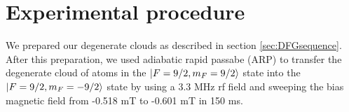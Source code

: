 \section{Experimental procedure}
We prepared our degenerate \K{} clouds as described in section \ref{sec:DFGsequence}. After this preparation, we used adiabatic rapid passabe (ARP) to transfer the degenerate cloud of \K{} atoms in the $\mathinner{|{F=9/2,m_F=9/2}\rangle}$ state into the $\mathinner{|{F=9/2,m_F=-9/2}\rangle}$ state by using a 3.3 MHz rf field and sweeping the bias magnetic field from -0.518 mT to -0.601 mT in 150 ms.
%


